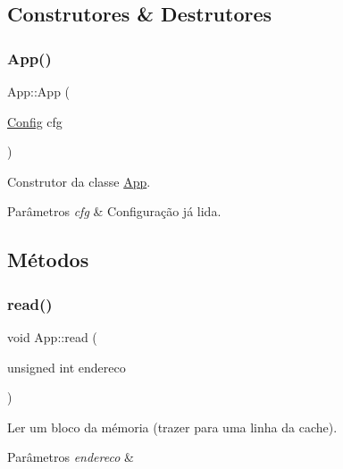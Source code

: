 \subsection{Construtores \& Destrutores}
\mbox{\label{classApp_a9035c72be7a12b46180e6d45b87436ee}} 
\subsubsection{\texorpdfstring{App()}{App()}}
{\footnotesize\ttfamily App\+::\+App (\begin{DoxyParamCaption}\item[{\hyperlink{structConfig}{Config}}]{cfg }\end{DoxyParamCaption})}



Construtor da classe \hyperlink{classApp}{App}. 


\begin{DoxyParams}{Parâmetros}
{\em cfg} & Configuração já lida. \\
\hline
\end{DoxyParams}


\subsection{Métodos}
\mbox{\label{classApp_ade8467361fe8300a45ee03433a5da7be}} 
\subsubsection{\texorpdfstring{read()}{read()}}
{\footnotesize\ttfamily void App\+::read (\begin{DoxyParamCaption}\item[{unsigned int}]{endereco }\end{DoxyParamCaption})}



Ler um bloco da mémoria (trazer para uma linha da cache). 


\begin{DoxyParams}{Parâmetros}
{\em endereco} & \\
\hline
\end{DoxyParams}
\mbox{\label{classApp_ab72f344e7a9f4113c8624bdb2cfd16ee}} 
